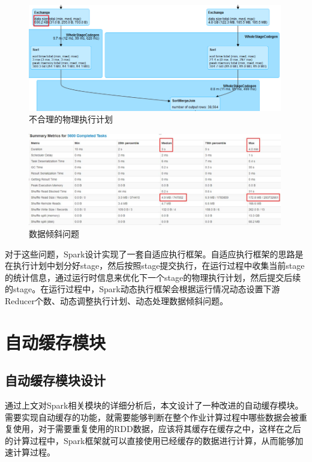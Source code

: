 \begin{figure}[htbp]
    \centering
    \includegraphics[width=0.99\textwidth]{Img/wrong-sort-join.png}
    \caption{不合理的物理执行计划}
    \label{fig:wrong-sort-join}
\end{figure}

\begin{figure}[htbp]
    \centering
    \includegraphics[width=0.99\textwidth]{Img/data-qingxie .png}
    \caption{数据倾斜问题}
    \label{fig:data-qinxie}
\end{figure}


对于这些问题，Spark设计实现了一套自适应执行框架。自适应执行框架的思路是在执行计划中划分好stage，然后按照stage提交执行，在运行过程中收集当前stage的统计信息，通过运行时信息来优化下一个stage的物理执行计划，然后提交后续的stage。在运行过程中，Spark动态执行框架会根据运行情况动态设置下游Reducer个数、动态调整执行计划、动态处理数据倾斜问题。

\section{自动缓存模块}

\subsection{自动缓存模块设计}
通过上文对Spark相关模块的详细分析后，本文设计了一种改进的自动缓存模块。需要实现自动缓存的功能，就需要能够判断在整个作业计算过程中哪些数据会被重复使用，对于需要重复使用的RDD数据，应该将其缓存在缓存之中，这样在之后的计算过程中，Spark框架就可以直接使用已经缓存的数据进行计算，从而能够加速计算过程。

